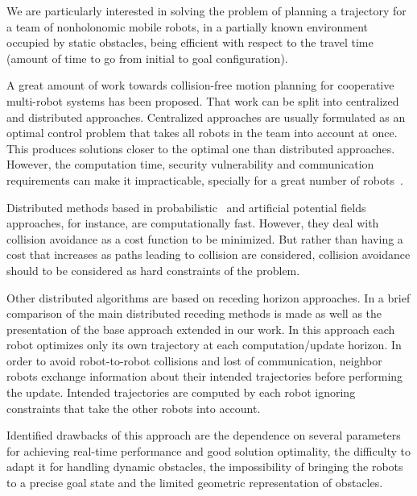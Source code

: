 \documentclass[eprint]{actapoly}
\begin{document}
We are particularly interested in solving the problem of planning a 
trajectory for a team of nonholonomic mobile robots, in a partially known 
environment occupied by static obstacles, being efficient with respect to the 
travel time (amount of time to go from initial to goal configuration).



A great amount of work towards collision-free motion 
planning for cooperative multi-robot systems has been proposed. That work can
be split into centralized and distributed approaches.
Centralized approaches are usually formulated as an optimal
control problem that takes all robots in the team into account at once.
This produces solutions closer to the optimal one than distributed approaches. However, the computation time, security vulnerability and communication 
requirements can make it impracticable, specially for a great number of 
robots~\cite{Borrelli2006}.

Distributed methods based in probabilistic~\cite{Sanchez2002} and artificial 
potential fields~\cite{Khatib1986} approaches, for instance, are computationally fast.
However, they deal with collision avoidance as a cost function to be minimized.
But rather than having a cost that increases as paths leading
to collision are considered, collision avoidance should to be considered as hard constraints of the problem.


Other distributed algorithms are based on receding horizon approaches.
In \cite{Defoort2009} a brief comparison of the main distributed receding 
methods is made as well as the presentation of the base approach extended in
our work.
In this approach each robot optimizes only its own 
trajectory at each computation/update horizon. In order to
avoid robot-to-robot collisions and lost of communication, neighbor robots 
exchange information about their intended trajectories before 
performing the update. Intended trajectories are computed by each robot
ignoring constraints that take the other robots into account.

Identified drawbacks of this approach are the dependence on 
several parameters for achieving real-time performance and good solution 
optimality, the difficulty to adapt it for handling dynamic obstacles, the 
impossibility of bringing the robots to a precise goal state and the limited
geometric representation of obstacles.
\end{document}
